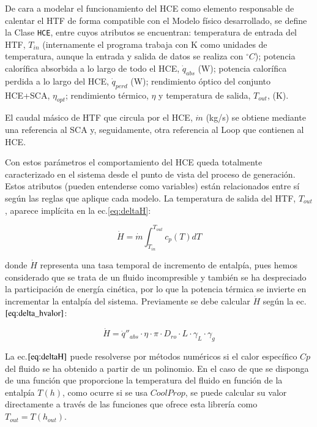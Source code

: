 De cara a modelar el funcionamiento del HCE como elemento responsable de calentar el HTF de forma compatible con el Modelo físico desarrollado, se define la Clase \texttt{HCE}, entre cuyos atributos se encuentran: temperatura de entrada del HTF, $T_{in}$ (internamente el programa trabaja con K como unidades de temperatura, aunque la entrada y salida de datos se realiza con $^\circ C$); potencia calorífica absorbida a lo largo de todo el HCE, $\dot q_{abs}$ (W); potencia calorífica perdida a lo largo del HCE, $\dot q_{perd}$ (W); rendimiento óptico del conjunto HCE+SCA, $\eta_{opt}$; rendimiento térmico, $\eta$ y temperatura de salida, $T_{out}$, (K). 

El caudal másico de HTF que circula por el HCE, $ \dot m $ (kg/s) se obtiene mediante una referencia al SCA y, seguidamente, otra referencia al Loop que contienen al HCE. 

Con estos parámetros el comportamiento del HCE queda totalmente caracterizado en el sistema desde el punto de vista del proceso de generación. Estos atributos (pueden entenderse como variables) están relacionados entre sí según las reglas que aplique cada modelo. La temperatura de salida del HTF, $T_{out}$, aparece implícita en la ec.\ref{eq:deltaH}:

\begin{equation}
    \dot H =  \dot m  \int^{T_{out}}_{T_{in}}c_p(T) dT 
    \label{eq:deltaH}
\end{equation}

donde \(\dot H\) representa una tasa temporal de incremento de entalpía, pues hemos considerado que se trata de un fluido incompresible y también se ha despreciado la participación de energía cinética, por lo que la potencia térmica se invierte en incrementar la entalpía del sistema. Previamente se debe calcular \(\dot H\) según la ec.\(\eqref{eq:delta_hvalor}\):

\begin{equation}
   \dot H =  \dot q''_{abs} \cdot \eta \cdot \pi \cdot D_{ro} \cdot L \cdot \gamma_L \cdot \gamma_g
    \label{eq:delta_hvalor}
\end{equation}

La ec.\(\eqref{eq:deltaH}\) puede resolverse por métodos numéricos si el calor específico \(Cp\) del fluido se ha obtenido a partir de un polinomio. En el caso de que se disponga de una función que proporcione la temperatura del fluido en función de la entalpía \(T(h)\), como ocurre si se usa \(CoolProp\), se puede calcular su valor directamente a través de las funciones que ofrece esta librería como \(T_{out} = T(h_{out})\).

